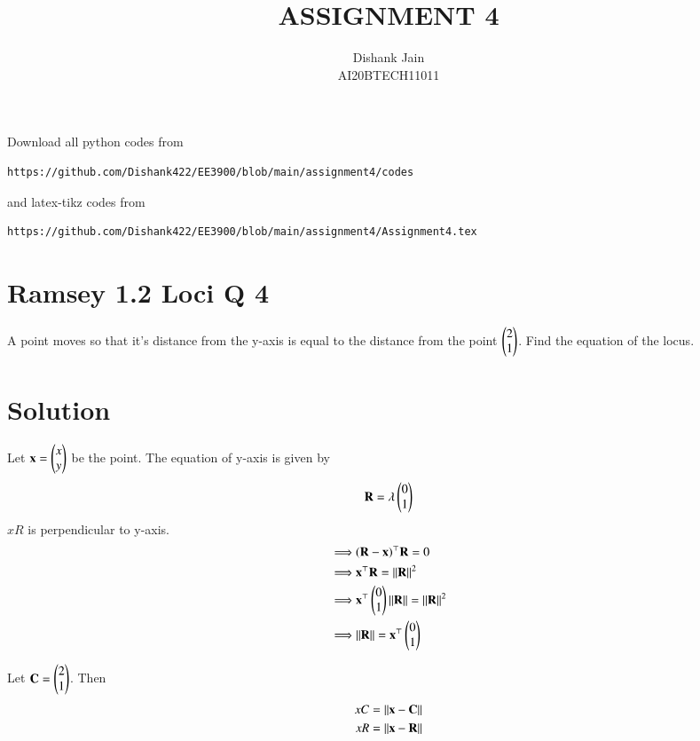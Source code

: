 \documentclass[journal,12pt,twocolumn]{IEEEtran}
\begin{document}
     \def\centbox#1{\makebox[0in]{#1}}
     \def\topbox#1{\raisebox{-\baselineskip}[0in][0in]{#1}}
     \def\midbox#1{\raisebox{-0.5\baselineskip}[0in][0in]{#1}}
\vspace{3cm}
\title{ASSIGNMENT 4}
\author{Dishank Jain \\ AI20BTECH11011}
\maketitle
\newpage
\bigskip
\renewcommand{\thefigure}{\theenumi}
\renewcommand{\thetable}{\theenumi}
Download all python codes from
%
\begin{lstlisting}
https://github.com/Dishank422/EE3900/blob/main/assignment4/codes
\end{lstlisting}
% 
and latex-tikz codes from 
%
\begin{lstlisting}
https://github.com/Dishank422/EE3900/blob/main/assignment4/Assignment4.tex
\end{lstlisting}
%
\section{Ramsey 1.2 Loci Q 4}
A point moves so that it's distance from the y-axis is equal to the distance from the point $\begin{pmatrix}2\\1\end{pmatrix}$. Find the equation of the locus. 

\section{Solution}
Let $\mathbf{x} = \begin{pmatrix}x\\y\end{pmatrix}$ be the point. The equation of y-axis is given by
\begin{equation}
    \mathbf{R} = \lambda \begin{pmatrix}0\\1\end{pmatrix}
\end{equation}
$xR$ is perpendicular to y-axis.
\begin{align}
    \implies &(\mathbf{R} - \mathbf{x})^\top \mathbf{R} = 0\\
    \implies &\mathbf{x}^\top \mathbf{R} = \lVert\mathbf{R}\rVert^2\label{RelxR}\\
    \implies &\mathbf{x}^\top \begin{pmatrix}0\\1\end{pmatrix}\lVert\mathbf{R}\rVert = \lVert\mathbf{R}\rVert^2\\
    \implies &\lVert\mathbf{R}\rVert = \mathbf{x}^\top \begin{pmatrix}0\\1\end{pmatrix}
\end{align}

Let $\mathbf{C} = \begin{pmatrix}2\\1\end{pmatrix}$. Then
\begin{align}
     xC &= \lVert\mathbf{x} - \mathbf{C}\rVert\\
     xR &= \lVert\mathbf{x} - \mathbf{R}\rVert
\end{align}
\end{document}
